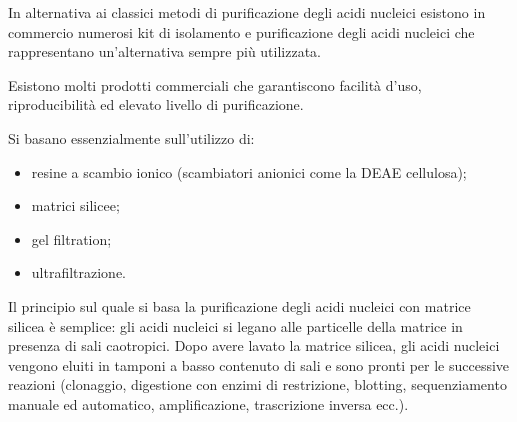 \documentclass[]{article}
\begin{document}
In alternativa ai classici metodi di purificazione degli acidi nucleici
esistono in commercio numerosi kit di isolamento e purificazione degli
acidi nucleici che rappresentano un'alternativa sempre più utilizzata.

Esistono molti prodotti commerciali che garantiscono facilità d'uso,
riproducibilità ed elevato livello di purificazione.

Si basano essenzialmente sull'utilizzo di:

\begin{itemize}
\itemsep1pt\parskip0pt
\item
  resine a scambio ionico (scambiatori anionici come la DEAE cellulosa);
\item
  matrici silicee;
\item
  gel filtration;
\item
  ultrafiltrazione.
\end{itemize}

Il principio sul quale si basa la purificazione degli acidi nucleici con
matrice silicea è semplice: gli acidi nucleici si legano alle particelle
della matrice in presenza di sali caotropici. Dopo avere lavato la
matrice silicea, gli acidi nucleici vengono eluiti in tamponi a basso
contenuto di sali e sono pronti per le successive reazioni (clonaggio,
digestione con enzimi di restrizione, blotting, sequenziamento manuale
ed automatico, amplificazione, trascrizione inversa ecc.).
\end{document}
